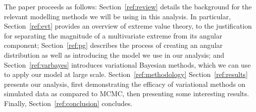 
The paper proceeds as follows:  Section~\ref{ref:review} details the background 
    for the relevant modelling methods we will be using in this analysis.  In 
    particular, Section~\ref{ref:evt} 
    provides an overview of extreme value theory, to the justification for 
    separating the magnitude of a multivariate extreme from its angular 
    component; Section~\ref{ref:pg} describes the process of creating an angular 
    distribution as well as introducing the model we use in our analysis; and 
    Section~\ref{ref:varbayes} introduces variational Bayesian methods, which we 
    can use to apply our model at large scale. Section~\ref{ref:methodology} 
    Section~\ref{ref:results} presents our analysis, first demonstrating the 
    efficacy of variational methods on simulated data as compared to MCMC, then
    presenting some interesting results. Finally, Section~\ref{ref:conclusion} 
    concludes.

